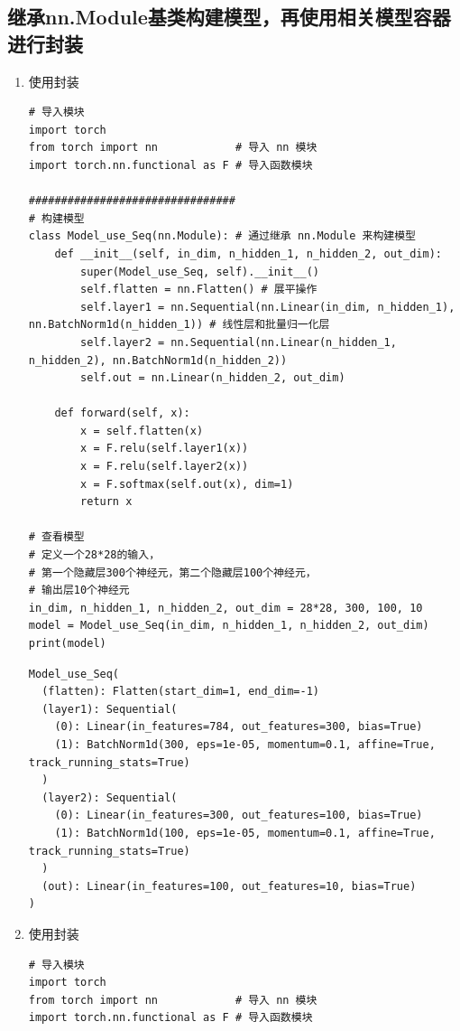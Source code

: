 \subsection{继承nn.Module基类构建模型，再使用相关模型容器进行封装}
\label{subsubsec:Pytorch_build_model_with_nn_Module_container}
\begin{enumerate}[label=\arabic*)]
    \item 使用封装
\begin{lstlisting}[style=pythonstyle]
# 导入模块
import torch
from torch import nn            # 导入 nn 模块
import torch.nn.functional as F # 导入函数模块

################################
# 构建模型
class Model_use_Seq(nn.Module): # 通过继承 nn.Module 来构建模型
    def __init__(self, in_dim, n_hidden_1, n_hidden_2, out_dim):
        super(Model_use_Seq, self).__init__()
        self.flatten = nn.Flatten() # 展平操作
        self.layer1 = nn.Sequential(nn.Linear(in_dim, n_hidden_1), nn.BatchNorm1d(n_hidden_1)) # 线性层和批量归一化层
        self.layer2 = nn.Sequential(nn.Linear(n_hidden_1, n_hidden_2), nn.BatchNorm1d(n_hidden_2))
        self.out = nn.Linear(n_hidden_2, out_dim)

    def forward(self, x):
        x = self.flatten(x)
        x = F.relu(self.layer1(x))
        x = F.relu(self.layer2(x))
        x = F.softmax(self.out(x), dim=1)
        return x
    
# 查看模型
# 定义一个28*28的输入，
# 第一个隐藏层300个神经元，第二个隐藏层100个神经元，
# 输出层10个神经元
in_dim, n_hidden_1, n_hidden_2, out_dim = 28*28, 300, 100, 10
model = Model_use_Seq(in_dim, n_hidden_1, n_hidden_2, out_dim)
print(model)
\end{lstlisting}
\begin{lstlisting}[style=demostyle,numbers=none]
Model_use_Seq(
  (flatten): Flatten(start_dim=1, end_dim=-1)
  (layer1): Sequential(
    (0): Linear(in_features=784, out_features=300, bias=True)
    (1): BatchNorm1d(300, eps=1e-05, momentum=0.1, affine=True, track_running_stats=True)
  )
  (layer2): Sequential(
    (0): Linear(in_features=300, out_features=100, bias=True)
    (1): BatchNorm1d(100, eps=1e-05, momentum=0.1, affine=True, track_running_stats=True)
  )
  (out): Linear(in_features=100, out_features=10, bias=True)
)    
\end{lstlisting}

    \item 使用封装
\begin{lstlisting}[style=pythonstyle]
# 导入模块
import torch
from torch import nn            # 导入 nn 模块
import torch.nn.functional as F # 导入函数模块


\end{lstlisting}
\end{enumerate}
